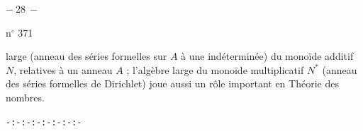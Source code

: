 \begin{center}$-\ 28\ -$\end{center}
\hfill n$^\circ$ 371

large (anneau des séries formelles sur $A$ à une indéterminée) du monoïde additif $N$, relatives à un anneau $A$ ; l'algèbre large du monoïde multiplicatif $N^*$ (anneau des séries formelles de Dirichlet) joue aussi un rôle important en Théorie des nombres.

\begin{center}\texttt{-:-:-:-:-:-:-:-}\end{center}
